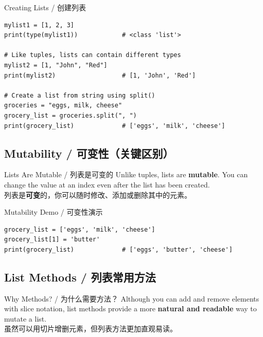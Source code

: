\documentclass[11pt,a4paper]{report}
\begin{document}
\begin{examplebox}{Creating Lists / 创建列表}
\begin{lstlisting}
mylist1 = [1, 2, 3]
print(type(mylist1))            # <class 'list'>

# Like tuples, lists can contain different types
mylist2 = [1, "John", "Red"]
print(mylist2)                  # [1, 'John', 'Red']

# Create a list from string using split()
groceries = "eggs, milk, cheese"
grocery_list = groceries.split(", ")
print(grocery_list)             # ['eggs', 'milk', 'cheese']
\end{lstlisting}
\end{examplebox}

\subsection{Mutability / 可变性（关键区别）}

\begin{concept}{Lists Are Mutable / 列表是可变的}
    Unlike tuples, lists are \textbf{mutable}. You can change the value at an index even after the list has been created. \\
    列表是\textbf{可变}的，你可以随时修改、添加或删除其中的元素。
\end{concept}

\begin{examplebox}{Mutability Demo / 可变性演示}
\begin{lstlisting}
grocery_list = ['eggs', 'milk', 'cheese']
grocery_list[1] = 'butter'
print(grocery_list)             # ['eggs', 'butter', 'cheese']
\end{lstlisting}
\end{examplebox}

\subsection{List Methods / 列表常用方法}

\begin{concept}{Why Methods? / 为什么需要方法？}
    Although you can add and remove elements with slice notation, list methods provide a more \textbf{natural and readable} way to mutate a list. \\
    虽然可以用切片增删元素，但列表方法更加直观易读。
\end{concept}
\end{document}
